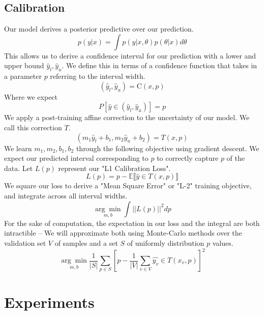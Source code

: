 \documentclass{article}
\begin{document}
\subsection{Calibration}
Our model derives a posterior predictive over our prediction.
\begin{equation}
    p(y|x) = \int p(y|x,\theta)p(\theta|x)d\theta
\end{equation}
This allows us to derive a confidence interval for our prediction with a lower and upper bound $\hat{y}_l, \hat{y}_u$. We define this in terms of a confidence function that takes in a parameter $p$ referring to the interval width.
\begin{equation}
    (\hat{y}_l, \hat{y}_u) = \textrm{C}(x, p)
\end{equation}
Where we expect
\begin{equation}
    P[\hat{y} \in (\hat{y}_l, \hat{y}_u)] = p
\end{equation}
We apply a post-training affine correction to the uncertainty of our model. We call this correction $T$.\newline
\begin{equation}
    (m_1\hat{y}_l + b_1, m_2\hat{y}_u + b_2) = T(x,p)
\end{equation}
We learn $m_1, m_2, b_1, b_2$ through the following objective using gradient descent. We expect our predicted interval corresponding to $p$ to correctly capture $p$ of the data. Let $L(p)$ represent our "L1 Calibration Loss".
\begin{equation}
    L(p) = p - \mathbb{E}\llbracket \hat{y} \in T(x, p)\rrbracket
\end{equation}
We square our loss to derive a "Mean Square Error" or "L-2" training objective, and integrate across all interval widths.
\begin{equation}
    \underset{m, b}{\arg\min}\int ||L(p)||^2dp
\end{equation}
For the sake of computation, the expectation in our loss and the integral are both intractible -- We will approximate both using Monte-Carlo methods over the validation set $V$ of samples and a set $S$ of uniformly distribution $p$ values.\newline
\begin{equation}
    \underset{m, b}{\arg\min}\frac{1}{|S|}\sum_{p \in S}[p-\frac{1}{|V|}\sum_{v\in V}\hat{y_v} \in T(x_v, p)]^2
\end{equation}


\section{Experiments}
\end{document}
